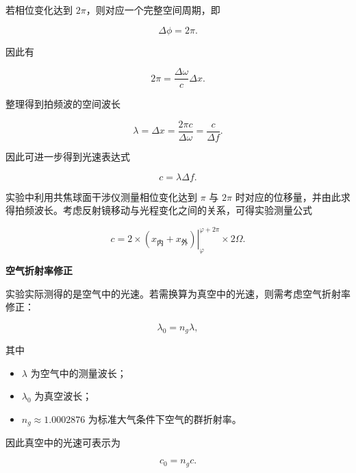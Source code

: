 \documentclass[a4paper]{ctexart}
\begin{document}
若相位变化达到 $2\pi$，则对应一个完整空间周期，即

\begin{equation}
    \Delta\phi = 2\pi.
\end{equation}

因此有

\begin{equation}
    2\pi
    =
    \frac{\Delta\omega}{c}\Delta x.
\end{equation}

整理得到拍频波的空间波长

\begin{equation}
    \lambda
    =
    \Delta x
    =
    \frac{2\pi c}{\Delta\omega}
    =
    \frac{c}{\Delta f}.
\end{equation}

因此可进一步得到光速表达式

\begin{equation}
    c=\lambda\Delta f.
\end{equation}

实验中利用共焦球面干涉仪测量相位变化达到 $\pi$ 与 $2\pi$ 时对应的位移量，并由此求得拍频波长。考虑反射镜移动与光程变化之间的关系，可得实验测量公式

\begin{equation}
\label{Ccal}
    c
    =
    2
    \times
    \left.
    \left(
    x_{\mathrm{内}}
    +
    x_{\mathrm{外}}
    \right)
    \right|_{\varphi}^{\varphi+2\pi}
    \times
    2\Omega.
\end{equation}

\vspace{0.5em}

\textbf{空气折射率修正}

实验实际测得的是空气中的光速。若需换算为真空中的光速，则需考虑空气折射率修正：

\begin{equation}
    \lambda_0 = n_g \lambda,
\end{equation}

其中

\begin{itemize}
    \item $\lambda$ 为空气中的测量波长；
    \item $\lambda_0$ 为真空波长；
    \item $n_g \approx 1.0002876$ 为标准大气条件下空气的群折射率。
\end{itemize}

因此真空中的光速可表示为

\begin{equation}
    c_0 = n_g c.
\end{equation}
\end{document}

